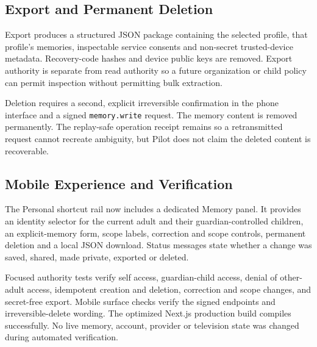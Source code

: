 \subsection{Export and Permanent Deletion}

Export produces a structured JSON package containing the selected profile, that profile's
memories, inspectable service consents and non-secret trusted-device metadata.  Recovery-code
hashes and device public keys are removed.  Export authority is separate from read authority so a
future organization or child policy can permit inspection without permitting bulk extraction.

Deletion requires a second, explicit irreversible confirmation in the phone interface and a signed
\texttt{memory.write} request.  The memory content is removed permanently.  The replay-safe
operation receipt remains so a retransmitted request cannot recreate ambiguity, but Pilot does not
claim the deleted content is recoverable.

\subsection{Mobile Experience and Verification}

The Personal shortcut rail now includes a dedicated Memory panel.  It provides an identity selector
for the current adult and their guardian-controlled children, an explicit-memory form, scope labels,
correction and scope controls, permanent deletion and a local JSON download.  Status messages state
whether a change was saved, shared, made private, exported or deleted.

Focused authority tests verify self access, guardian-child access, denial of other-adult access,
idempotent creation and deletion, correction and scope changes, and secret-free export.  Mobile
surface checks verify the signed endpoints and irreversible-delete wording.  The optimized Next.js
production build compiles successfully.  No live memory, account, provider or television state was
changed during automated verification.

\endgroup
